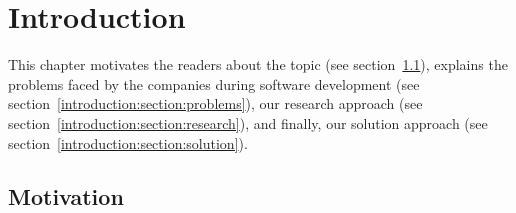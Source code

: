 
\chapter{Introduction}
\label{chap:introduction}
\ifpdf
    \graphicspath{{Chapters/Introduction/Figs/}{Chapters/Introduction/Figs/}{Chapters/Introduction/Figs/}}
\else
    \graphicspath{{Chapters/Introduction/Figs/}{Chapters/Introduction/Figs/}}
\fi
This chapter motivates the readers about the topic (see section~\ref{introduction:section:motivation}), explains the problems faced by the companies during software development (see section~\ref{introduction:section:problems}), our research approach (see section~\ref{introduction:section:research}), and finally, our solution approach (see section~\ref{introduction:section:solution}).

\section{Motivation} %
\label{introduction:section:motivation}


